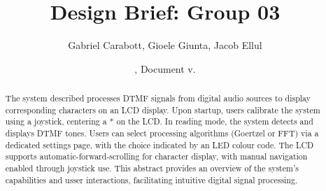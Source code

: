 \documentclass{cce2014-design}
\title{Design Brief: Group 03}
\author
{
	Gabriel Carabott,
	Gioele Giunta,
	Jacob Ellul
}
\date{\svnMaxToday, Document v.\svnInfoMaxRevision}
\begin{document}
\maketitle

\begin{abstract}
	The system described processes DTMF signals from
	digital audio sources
	to display corresponding characters on an LCD display. Upon startup,
	users
	calibrate the system using a joystick, centering a * on
	the LCD.
	In reading mode, the system detects and displays DTMF tones. Users can
	select
	processing algorithms (Goertzel or FFT) via a dedicated settings page,
	with the
	choice indicated by an LED colour code. The LCD supports
	automatic-forward-scrolling for character display, with manual
	navigation
	enabled through joystick use. This abstract provides an overview of the
	system's capabilities and usser interactions, facilitating intuitive
	digital
	signal processing.
\end{abstract}
\end{document}
